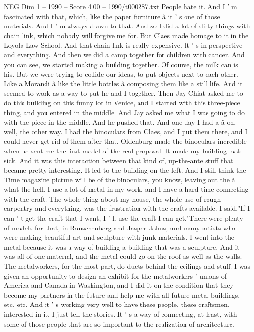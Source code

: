 \begin{textsample}{NEG Dim 1 – 1990 – Score 4.00 – 1990/t000287.txt}
People hate it.
And I ' m fascinated with that, which, like the paper furniture â it ' s one of those materials.
And I ' m always drawn to that.
And so I did a lot of dirty things with chain link, which nobody will forgive me for.
But Claes made homage to it in the Loyola Law School.
And that chain link is really expensive.
It ' s in perspective and everything.
And then we did a camp together for children with cancer.
And you can see, we started making a building together.
Of course, the milk can is his.
But we were trying to collide our ideas, to put objects next to each other.
Like a Morandi â like the little bottles â composing them like a still life.
And it seemed to work as a way to put he and I together.
Then Jay Chiat asked me to do this building on this funny lot in Venice, and I started with this three-piece thing, and you entered in the middle.
And Jay asked me what I was going to do with the piece in the middle.
And he pushed that.
And one day I had a â oh, well, the other way.
I had the binoculars from Claes, and I put them there, and I could never get rid of them after that.
Oldenburg made the binoculars incredible when he sent me the first model of the real proposal.
It made my building look sick.
And it was this interaction between that kind of, up-the-ante stuff that became pretty interesting.
It led to the building on the left.
And I still think the Time magazine picture will be of the binoculars, you know, leaving out the â what the hell.
I use a lot of metal in my work, and I have a hard time connecting with the craft.
The whole thing about my house, the whole use of rough carpentry and everything, was the frustration with the crafts available.
I said,"If I can ' t get the craft that I want, I ' ll use the craft I can get."There were plenty of models for that, in Rauschenberg and Jasper Johns, and many artists who were making beautiful art and sculpture with junk materials.
I went into the metal because it was a way of building a building that was a sculpture.
And it was all of one material, and the metal could go on the roof as well as the walls.
The metalworkers, for the most part, do ducts behind the ceilings and stuff.
I was given an opportunity to design an exhibit for the metalworkers ' unions of America and Canada in Washington, and I did it on the condition that they become my partners in the future and help me with all future metal buildings, etc. etc.
And it ' s working very well to have these people, these craftsmen, interested in it.
I just tell the stories.
It ' s a way of connecting, at least, with some of those people that are so important to the realization of architecture.

\end{textsample}
